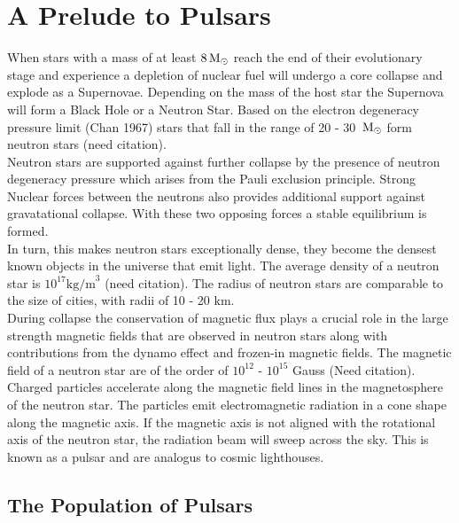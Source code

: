 \setcounter{page}{1} 
\section{A Prelude to Pulsars}
When stars with a mass of at least $8 \, \text{M}_\odot$ reach the end of their evolutionary stage and experience a depletion of nuclear fuel will undergo a core collapse and explode as a Supernovae. Depending on the mass of the host star the Supernova will form a Black Hole or a Neutron Star. Based on the electron degeneracy pressure limit (Chan 1967) stars that fall in the range of 20 - 30 $\, \text{M}_\odot$ form neutron stars (need citation). \\

Neutron stars are supported against further collapse by the presence of neutron degeneracy pressure which arises from the Pauli exclusion principle. Strong Nuclear forces between the neutrons also provides additional support against gravatational collapse. With these two opposing forces a stable equilibrium is formed. \\ 

In turn, this makes neutron stars exceptionally dense, they become the densest known objects in the universe that emit light. The average density of a neutron star is $10^{17} \text{kg/m}^3$ (need citation). The radius of neutron stars are comparable to the size of cities, with radii of 10 - 20 km. \\

During collapse the conservation of magnetic flux plays a crucial role in the large strength magnetic fields that are observed in neutron stars along with contributions from the dynamo effect and frozen-in magnetic fields. The magnetic field of a neutron star are of the order of $10^{12}$ - $10^{15}$ Gauss (Need citation). \\

Charged particles accelerate along the magnetic field lines in the magnetosphere of the neutron star. The particles emit electromagnetic radiation in a cone shape along the magnetic axis. If the magnetic axis is not aligned with the rotational axis of the neutron star, the radiation beam will sweep across the sky. This is known as a pulsar and are analogus to cosmic lighthouses.  \\

\subsection{The Population of Pulsars}

